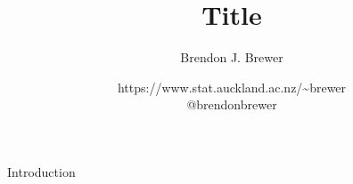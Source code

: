 \documentclass{beamer}
\author{Brendon J. Brewer}
\title{Title}
\institute{Department of Statistics, The University of Auckland}
\date{{\color{blue} https://www.stat.auckland.ac.nz/\~{ }brewer}\\
\vspace{10pt}
{\color{blue} @brendonbrewer}}
\begin{document}
\begin{frame}[t,plain]
\titlepage
\end{frame}

\begin{frame}[t]{Introduction}
\begin{center}
\end{center}
\end{frame}
\end{document}
